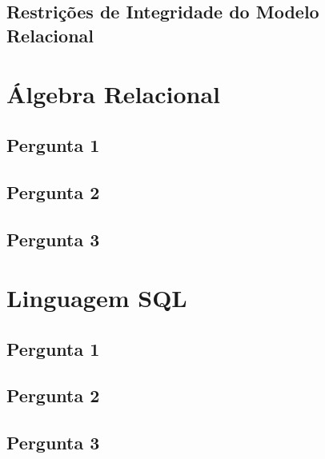 \documentclass[11pt,a4paper]{article}
\begin{document}
\subsection{Restri\c{c}\~oes de Integridade do Modelo Relacional}
\section{\'{A}lgebra Relacional}
\subsection{Pergunta 1}
\subsection{Pergunta 2}
\subsection{Pergunta 3}

\section{Linguagem SQL}
\subsection{Pergunta 1}
\subsection{Pergunta 2}
\subsection{Pergunta 3}
\end{document}

